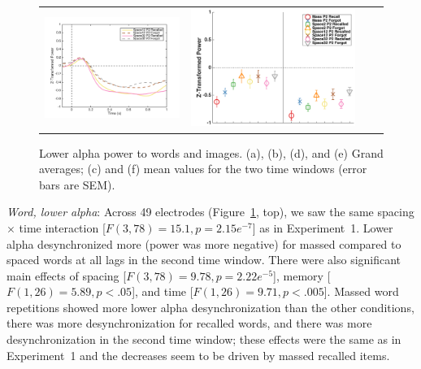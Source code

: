 \begin{figure}[H]
\begin{tabular}{cccc}
  \includegraphics[width=.29\textwidth]{./figs/exp2/tfr_line/tfr_line_ga_img_rc_spac12_p2_img_fo_spac12_p2_img_rc_spac32_p2_img_fo_spac32_p2_8_10_-100_1000_94ROIs_legend} &
  \includegraphics[width=.30\textwidth]{./figs/exp2/tfr_avg/tfr_avg_ga_img_rc_mass_p2_img_fo_mass_p2_img_rc_spac2_p2_img_fo_spac2_p2_img_rc_spac12_p2_img_fo_spac12_p2_img_rc_spac32_p2_img_fo_spac32_p2_8_10_0_500_500_1000_94ROI_ylabel} \\
  \end{tabular}
  \caption{Lower alpha power to words and images.  (a), (b), (d), and (e) Grand averages; (c) and (f) mean values for the two time windows (error bars are SEM).}
  \label{fig:s2_word_img_alpha_low}
\end{figure}


\textit{Word, lower alpha}: Across 49 electrodes (Figure~\ref{fig:s2_word_img_alpha_low}, top), we saw the same spacing $\times$ time interaction [$F(3,78)=15.1, p=2.15e^{-7}$] as in Experiment~1.  Lower alpha desynchronized more (power was more negative) for massed compared to spaced words at all lags in the second time window.  There were also significant main effects of spacing [$F(3,78)=9.78, p=2.22e^{-5}$], memory [$F(1,26)=5.89, p<.05$], and time [$F(1,26)=9.71, p<.005$].  Massed word repetitions showed more lower alpha desynchronization than the other conditions, there was more desynchronization for recalled words, and there was more desynchronization in the second time window; these effects were the same as in Experiment~1 and the decreases seem to be driven by massed recalled items.


